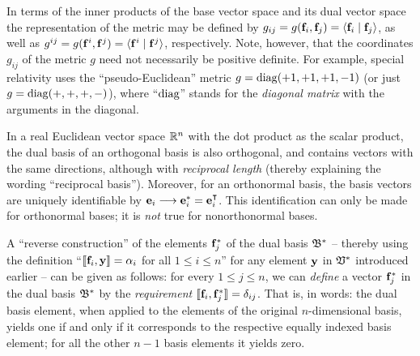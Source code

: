 In terms of the inner products of the base vector space and its dual vector space the representation
of the metric
may be defined by
$g_{ij}=g({\bf f}_i,{\bf f}_j)=\langle {\bf f}_i\mid {\bf f}_j\rangle$,
as well as
$g^{ij}=g({\bf f}^i,{\bf f}^j) =\langle {\bf f}^i\mid {\bf f}^j\rangle$, respectively.
Note, however, that the coordinates $g_{ij}$ of
the metric $g$ need not necessarily be positive definite.
For example,  special relativity uses the ``pseudo-Euclidean'' metric
 $g={\rm diag}(+1,+1,+1,-1)$ (or just $g={\rm diag}(+,+,+,-)$), where ``${\rm diag}$''
stands for the {\em diagonal matrix}
with the arguments in the diagonal.




In a real Euclidean vector space ${\Bbb R}^n$
with the dot product as the scalar product,
the dual basis of an orthogonal basis  is also orthogonal, and contains vectors with the same directions,
although with {\em reciprocal length} (thereby explaining the wording ``reciprocal basis'').
Moreover, for an orthonormal basis, the basis vectors are uniquely identifiable by
${\bf e}_i \longrightarrow {\bf e}_i^* = {\bf e}_i^\intercal $.
This identification can only be made for orthonormal bases; it is {\em not} true for nonorthonormal bases.



A ``reverse construction'' of the elements ${\bf f}_j^\ast $ of the dual basis ${\frak B}^\ast $
-- thereby using the definition ``$\llbracket {\bf f}_i,{\bf y}\rrbracket  = \alpha_i$
for all $1 \le i \le n$''
for any element ${\bf y}$ in ${\frak V}^\ast $ introduced earlier
--
can be given as follows:
for every $1\le j \le n$,
we can {\em define} a vector ${\bf f}_j^\ast $ in the dual basis ${\frak B}^\ast $
by the {\em requirement}   $\llbracket {\bf f}_i,{\bf f}_j^\ast \rrbracket  = \delta_{ij}$.
That is, in words:
the dual basis element, when applied to the elements of the original $n$-dimensional basis,
yields one if and only if  it corresponds to the respective equally indexed basis element;
for all the other $n-1$ basis elements it yields zero.

